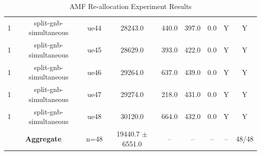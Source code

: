 \begin{table}[ht]
\begin{tabular}{|c|c|c|c|c|c|c|c|c|}
1 & split-gnb-simultaneous & ue44 & 28243.0 & 440.0 & 397.0 & 0.0 & Y & Y \\
1 & split-gnb-simultaneous & ue45 & 28629.0 & 393.0 & 422.0 & 0.0 & Y & Y \\
1 & split-gnb-simultaneous & ue46 & 29264.0 & 637.0 & 439.0 & 0.0 & Y & Y \\
1 & split-gnb-simultaneous & ue47 & 29274.0 & 218.0 & 431.0 & 0.0 & Y & Y \\
1 & split-gnb-simultaneous & ue48 & 30120.0 & 664.0 & 432.0 & 0.0 & Y & Y \\
\multicolumn{2}{|c|}{\textbf{Aggregate}} & n=48 & 19440.7 $\pm$ 6551.0 & -- & -- & -- & -- & 48/48 \\
\hline
\end{tabular}
\caption{AMF Re-allocation Experiment Results}
\label{tab:amf_realloc}
\end{table}
